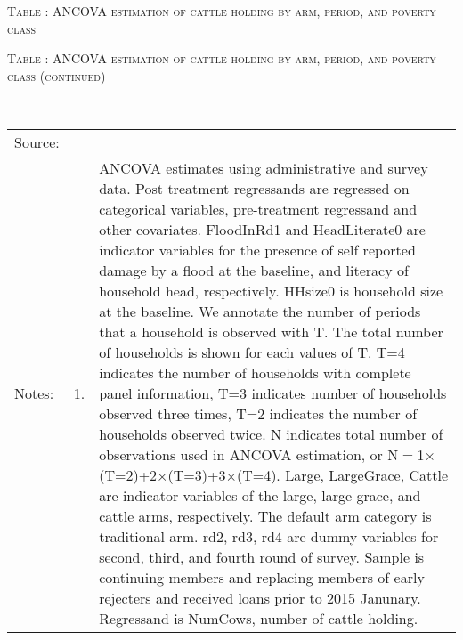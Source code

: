 \hspace{-1cm}\begin{minipage}[t]{14cm}
\hfil\textsc{\normalsize Table \thetable: ANCOVA estimation of cattle holding by arm, period, and poverty class\label{tab NumCowsTimeVaryingPovertyStatusANCOVA1}}\\
\setlength{\tabcolsep}{1pt}
\setlength{\baselineskip}{8pt}
\renewcommand{\arraystretch}{.55}
\hfil{}
\end{minipage}

\hspace{-1cm}\begin{minipage}[t]{14cm}
\hfil\textsc{\normalsize Table \thetable: ANCOVA estimation of cattle holding by arm, period, and poverty class (continued)\label{tab NumCowsTimeVaryingPovertyStatusANCOVA2}}\\
\setlength{\tabcolsep}{1pt}
\setlength{\baselineskip}{8pt}
\renewcommand{\arraystretch}{.55}
\hfil{}\\
\renewcommand{\arraystretch}{.8}
\setlength{\tabcolsep}{1pt}
\begin{tabular}{>{\hfill\scriptsize}p{1cm}<{}>{\hfill\scriptsize}p{.25cm}<{}>{\scriptsize}p{12cm}<{\hfill}}
Source:& \multicolumn{2}{l}{\scriptsize Estimated with GUK administrative and survey data.}\\
Notes: & 1. & ANCOVA estimates using administrative and survey data. Post treatment regressands are regressed on categorical variables, pre-treatment regressand and other covariates. \textsf{FloodInRd1} and \textsf{HeadLiterate0} are indicator variables for the presence of self reported damage by a flood at the baseline, and literacy of household head, respectively. \textsf{HHsize0} is household size at the baseline. We annotate the number of periods that a household is observed with \textsf{T}. The total number of households is shown for each values of \textsf{T}. \textsf{T=4} indicates the number of households with complete panel information, \textsf{T=3} indicates number of households observed three times, \textsf{T=2} indicates the number of households observed twice. \textsf{N} indicates total number of observations used in ANCOVA estimation, or \textsf{N$=$1$\times$(T=2)+2$\times$(T=3)+3$\times$(T=4)}.  \textsf{Large}, \textsf{LargeGrace}, \textsf{Cattle} are indicator variables of the \textsf{large}, \textsf{large grace}, and \textsf{cattle} arms, respectively. The default arm category is \textsf{traditional} arm. \textsf{rd2, rd3, rd4} are dummy variables for second, third, and fourth round of survey. Sample is continuing members and replacing members of early rejecters and received loans prior to 2015 Janunary. Regressand is \textsf{NumCows}, number of cattle holding. \\

\end{tabular}
\end{minipage}
